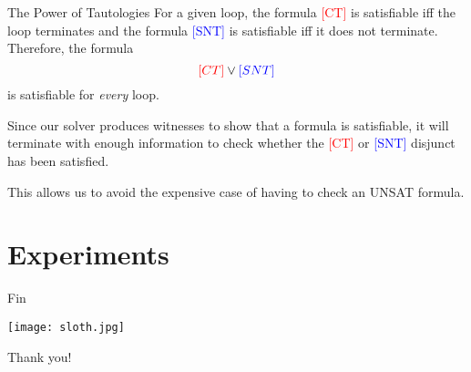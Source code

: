 \documentclass[xcolor=pdftex,t,11pt]{beamer}
\newcommand{\red}[1]{\textcolor{red}{#1}}
\newcommand{\blue}[1]{\textcolor{blue}{#1}}
\begin{document}
\begin{frame}{The Power of Tautologies}
 For a given loop, the formula \red{[CT]} is satisfiable iff the loop terminates and the formula \blue{[SNT]} is
 satisfiable iff it does not terminate.  Therefore, the formula
 \[
  \red{\text[CT]} \vee \blue{\text[SNT]}
 \]
 is satisfiable for \emph{every} loop.

 \vspace{1em}

 Since our solver produces witnesses to show that a formula is satisfiable, it will terminate with enough
 information to check whether the \red{[CT]} or \blue{[SNT]} disjunct has been satisfied.

 \vspace{1em}

 This allows us to avoid the expensive case of having to check an UNSAT formula.
\end{frame}

\section{Experiments}

\begin{frame}[fragile]{Fin}

\begin{center}
\texttt{[image: sloth.jpg]}

\Huge
 Thank you!
\end{center}

\end{frame}
\end{document}
